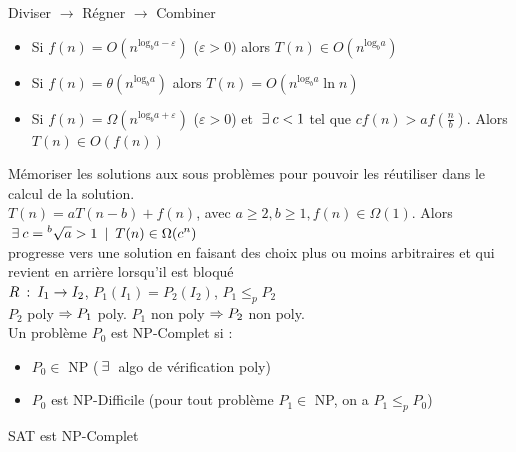 \documentclass[a4paper,11pt]{article}
\begin{document}
 Diviser $\rightarrow$ Régner $\rightarrow$ Combiner\\
\begin{itemize}
	\item Si $f(n) = O(n^{\mathrm{log}_ba-\varepsilon})$ ($\varepsilon > 0)$ alors $T(n)\in O(n^{\mathrm{log}_ba})$
	\item Si $f(n) = \theta(n^{\mathrm{log}_ba})$ alors $T(n) = O(n^{\mathrm{log}_ba}\ln n)$
	\item Si $f(n) = \Omega(n^{\mathrm{log}_ba+\varepsilon})$ ($\varepsilon > 0$) et $\: \exists \: c < 1$ tel que $cf(n) > af(\frac{n}{b})$. Alors $T(n) \in O(f(n))$
\end{itemize}
 Mémoriser les solutions aux sous problèmes pour pouvoir les réutiliser dans le calcul de la solution. \\
 $T(n) = aT(n-b) + f(n)$, avec $a\geq 2, b\geq 1, f(n) \in \Omega(1)$. Alors $\: \exists \: c = \displaystyle{^b\sqrt{a}} > 1 \; \: | \: \; T(n) \in \Omega(c^n)$\\
 progresse vers une solution en faisant des choix plus ou moins arbitraires et qui revient en arrière lorsqu'il est bloqué\\
 $R\: : \: I_1 \rightarrow I_2$, $P_1(I_1) = P_2(I_2)$, $P_1 \leq_p P_2$\\
 $P_2$ poly $\Rightarrow P_1$ poly. $P_1$ non poly $\Rightarrow P_2$ non poly. \\
 Un problème $P_0$ est NP-Complet si : 
\begin{itemize}
	\item $P_0 \in $ NP ($\: \exists \:$ algo de vérification poly)
	\item $P_0$ est NP-Difficile (pour tout problème $P_1 \in $ NP, on a $P_1 \leq_p P_0$) 
\end{itemize}
 SAT est NP-Complet \\
\end{document}
